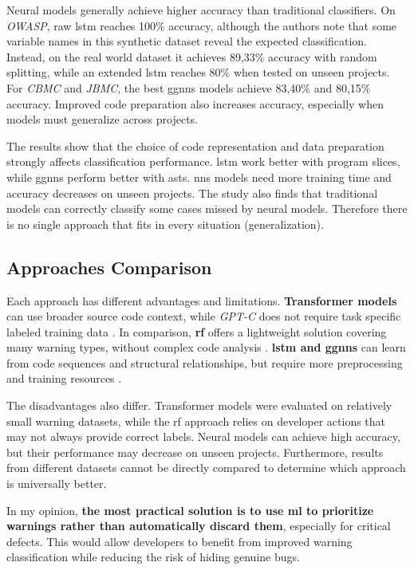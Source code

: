 \hspace{0.6em} Neural models generally achieve higher accuracy than traditional classifiers. On \textit{OWASP}, raw \gls{lstm} reaches 100\% accuracy, although the authors note that some variable names in this synthetic dataset reveal the expected classification. Instead, on the real world dataset it achieves 89,33\% accuracy with random splitting, while an extended \gls{lstm} reaches 80\% when tested on unseen projects. For \textit{CBMC} and \textit{JBMC}, the best \gls{ggnns} models achieve 83,40\% and 80,15\% accuracy. Improved code preparation also increases accuracy, especially when models must generalize across projects.

\hspace{0.6em} The results show that the choice of code representation and data preparation strongly affects classification performance. \gls{lstm} work better with program slices, while \gls{ggnns} perform better with \gls{asts}. \gls{nns} models need more training time and accuracy decreases on unseen projects. The study also finds that traditional models can correctly classify some cases missed by neural models. Therefore there is no single approach that fits in every situation (generalization).



\subsection{Approaches Comparison}

\hspace{0.6em} Each approach has different advantages and limitations. \textbf{Transformer models} can use broader source code context, while \textit{GPT-C} does not require task specific labeled training data \cite{paper1_kharkarlearning2022}. In comparison, \textbf{\gls{rf}} offers a lightweight solution covering many warning types, without complex code analysis \cite{paper2_hegedHus2022static}. \textbf{\gls{lstm} and \gls{ggnns}} can learn from code sequences and structural relationships, but require more preprocessing and training resources \cite{paper3_yerramreddy2023empirical}.

\hspace{0.6em} The disadvantages also differ. Transformer models were evaluated on relatively small warning datasets, while the \gls{rf} approach relies on developer actions that may not always provide correct labels. Neural models can achieve high accuracy, but their performance may decrease on unseen projects. Furthermore, results from different datasets cannot be directly compared to determine which approach is universally better.

\hspace{0.6em} In my opinion, \textbf{the most practical solution is to use \gls{ml} to prioritize warnings rather than automatically discard them}, especially for critical defects. This would allow developers to benefit from improved warning classification while reducing the risk of hiding genuine bugs.

